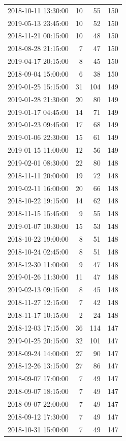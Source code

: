 \begin{tabular}{lrrr}
2018-10-11 13:30:00 & 10 & 55 & 150 \\
2019-05-13 23:45:00 & 10 & 52 & 150 \\
2018-11-21 00:15:00 & 10 & 48 & 150 \\
2018-08-28 21:15:00 & 7 & 47 & 150 \\
2019-04-17 20:15:00 & 8 & 45 & 150 \\
2018-09-04 15:00:00 & 6 & 38 & 150 \\
2019-01-25 15:15:00 & 31 & 104 & 149 \\
2019-01-28 21:30:00 & 20 & 80 & 149 \\
2019-01-17 04:45:00 & 14 & 71 & 149 \\
2019-01-23 09:45:00 & 17 & 68 & 149 \\
2019-01-06 22:30:00 & 15 & 61 & 149 \\
2019-01-15 11:00:00 & 12 & 56 & 149 \\
2019-02-01 08:30:00 & 22 & 80 & 148 \\
2018-11-11 20:00:00 & 19 & 72 & 148 \\
2019-02-11 16:00:00 & 20 & 66 & 148 \\
2018-10-22 19:15:00 & 14 & 62 & 148 \\
2018-11-15 15:45:00 & 9 & 55 & 148 \\
2019-01-07 10:30:00 & 15 & 53 & 148 \\
2018-10-22 19:00:00 & 8 & 51 & 148 \\
2018-10-24 02:45:00 & 8 & 51 & 148 \\
2018-12-30 11:00:00 & 9 & 47 & 148 \\
2019-01-26 11:30:00 & 11 & 47 & 148 \\
2019-02-13 09:15:00 & 8 & 45 & 148 \\
2018-11-27 12:15:00 & 7 & 42 & 148 \\
2018-11-17 10:15:00 & 2 & 24 & 148 \\
2018-12-03 17:15:00 & 36 & 114 & 147 \\
2019-01-25 20:15:00 & 32 & 101 & 147 \\
2018-09-24 14:00:00 & 27 & 90 & 147 \\
2018-12-26 13:15:00 & 27 & 86 & 147 \\
2018-09-07 17:00:00 & 7 & 49 & 147 \\
2018-09-07 18:15:00 & 7 & 49 & 147 \\
2018-09-07 22:00:00 & 7 & 49 & 147 \\
2018-09-12 17:30:00 & 7 & 49 & 147 \\
2018-10-31 15:00:00 & 7 & 49 & 147 \\

\end{tabular}
